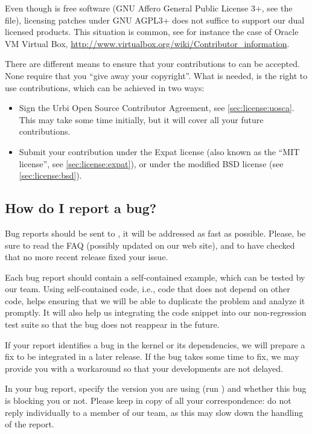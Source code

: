 Even though \usdk is free software (GNU Affero General Public License 3+,
see the  file), licensing patches under GNU AGPL3+ does
not suffice to support our dual licensed products.  This situation is
common, see for instance the case of Oracle VM Virtual Box,
\url{http://www.virtualbox.org/wiki/Contributor_information}.

There are different means to ensure that your contributions to \usdk can be
accepted.  None require that you ``give away your copyright''.  What is
needed, is the right to use contributions, which can be achieved in two
ways:
\begin{itemize}
\item Sign the Urbi Open Source Contributor Agreement, see
  \autoref{sec:license:uosca}.  This may take some time initially, but it
  will cover all your future contributions.
\item Submit your contribution under the Expat license (also known as the
  ``MIT license'', see \autoref{sec:license:expat}), or under the modified
  BSD license (see \autoref{sec:license:bsd}).
\end{itemize}



\subsection{How do I report a bug?}
\label{sec:bug}
Bug reports should be sent to , it will
be addressed as fast as possible.  Please, be sure to read the FAQ (possibly
updated on our web site), and to have checked that no more recent release
fixed your issue.

Each bug report should contain a self-contained example, which can be tested
by our team. Using self-contained code, i.e., code that does not depend on
other code, helps ensuring that we will be able to duplicate the problem and
analyze it promptly. It will also help us integrating the code snippet into
our non-regression test suite so that the bug does not reappear in the
future.

If your report identifies a bug in the \urbi kernel or its dependencies, we
will prepare a fix to be integrated in a later release. If the bug takes
some time to fix, we may provide you with a workaround so that your
developments are not delayed.

In your bug report, specify the \urbi version you are using (run ) and whether this bug is blocking you or not.  Please keep
 in copy of all your correspondence: do
not reply individually to a member of our team, as this may slow down the
handling of the report.

